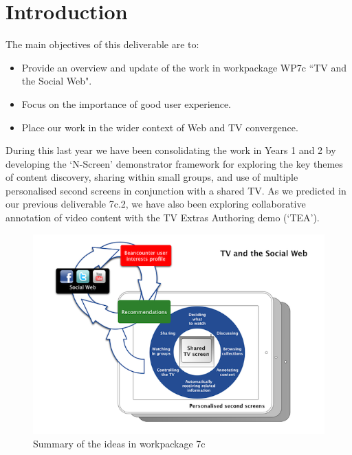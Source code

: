 \documentclass{notube}
\begin{document}
\maketitle

%

\chapter{Introduction}

The main objectives of this deliverable are to:

\begin{itemize}
\item{Provide an overview and update of the work in workpackage WP7c ``TV and the Social Web".}
\item{Focus on the importance of good user experience.}
\item{Place our work in the wider context of Web and TV convergence.}
\end{itemize}

During this last year we have been consolidating the work in Years 1 and 2 by developing the `N-Screen' demonstrator framework for exploring the key themes of content discovery, sharing within small groups, and use of multiple personalised second screens in conjunction with a shared TV. As we predicted in our previous deliverable 7c.2, we have also been exploring collaborative annotation of video content with the TV Extras Authoring demo (`TEA').

\begin{figure}[htbp]
\begin{center}
\includegraphics[width=6in]{images/summary.png}
\caption{Summary of the ideas in workpackage 7c} \label{fig:summary}
\end{center}
\end{figure} 
\end{document}

